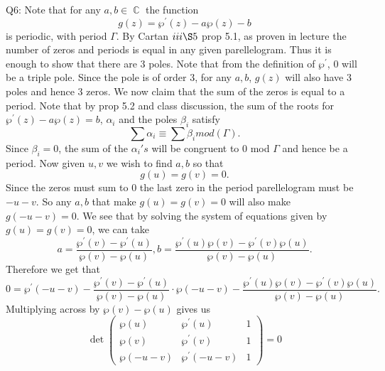 \documentclass[letterpaper]{article}
\DeclareMathOperator{\C}{\mathbb{C}}
\begin{document}
 \noindent  Q6:  Note that for any $a,b\in \C$ the function 
$$g(z) = \wp^\prime(z) - a \wp(z) -b$$ is periodic, with period $\Gamma$. By Cartan $iii \S5$ 
prop 5.1, as proven in lecture the number of zeros and periods is equal in any given parellelogram. 
Thus it is enough to show that there are $3$ poles. Note that from the definition of $\wp^\prime$, $0$ will be a triple pole.
Since the pole is 
of order $3$, for any $a,b$, $g(z)$ will also have $3$ poles and hence $3$ zeros. We now claim
that the sum of the zeros is equal to a period. Note that by prop 5.2 and class discussion, 
the sum of the roots for $\wp^\prime(z)-a\wp(z)=b$, $\alpha_i$ and the poles $\beta_i$ satisfy $$\sum \alpha_i \equiv \sum \beta_i mod(\Gamma).$$
Since $\beta_i=0$, the sum of the $\alpha_i's$ will be congruent to $0$ mod $\Gamma$ and hence be a period. 
Now given $u,v$ we wish to find $a,b$ so that $$g(u) = g(v)=0.$$
Since the zeros must sum to $0$ the last zero in the period parellelogram must be $-u-v$. So any $a,b$ that make $g(u)= g(v)=0$ will also make $g(-u-v)=0$. 
We see that by solving the system of equations given by $g(u) = g(v) =0$, we can take $$a = \frac{\wp^\prime(v) - \wp^\prime(u)}{\wp(v) - \wp(u)}, b = \frac{\wp^\prime(u)\wp(v) - \wp^\prime(v)\wp(u)}{\wp(v) - \wp(u)}.$$
Therefore we get that $$ 0 = \wp^\prime(-u-v) - \frac{\wp^\prime(v) - \wp^\prime(u)}{\wp(v) - \wp(u)} \cdot \wp(-u-v) -  \frac{\wp^\prime(u)\wp(v) - \wp^\prime(v)\wp(u)}{\wp(v) - \wp(u)}.$$
Multiplying across by $\wp(v) - \wp(u)$ gives us $$\det \begin{pmatrix}
    \wp(u) & \wp^\prime(u) & 1 \\
    \wp(v) & \wp^\prime(v) & 1 \\ 
    \wp(-u-v) & \wp^\prime(-u-v) & 1
\end{pmatrix}=0$$
\end{document}
